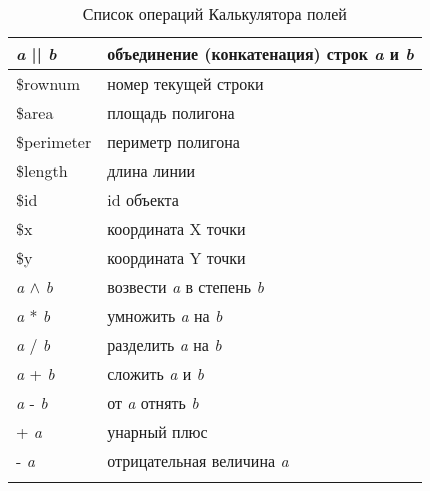 \begin{center}
{\begin{longtable}{|p{4cm}|p{10cm}|}
\hline \textit{a} || \textit{b} & объединение (конкатенация) строк \textit{a} и \textit{b} \\
\hline \$rownum & номер текущей строки \\
\hline \$area & площадь полигона \\
\hline \$perimeter & периметр полигона \\
\hline \$length & длина линии \\
\hline \$id & id объекта \\
\hline \$x & координата X точки \\
\hline \$y & координата Y точки \\
\hline \textit{a} $\wedge$ \textit{b} & возвести \textit{a} в степень \textit{b} \\
\hline \textit{a} * \textit{b} & умножить \textit{a} на \textit{b} \\
\hline \textit{a} / \textit{b} & разделить \textit{a} на \textit{b} \\
\hline \textit{a} + \textit{b} & сложить \textit{a} и \textit{b} \\
\hline \textit{a} - \textit{b} & от \textit{a} отнять \textit{b} \\
\hline + \textit{a} & унарный плюс \\
\hline - \textit{a} & отрицательная величина \textit{a} \\
\hline
\caption{Список операций Калькулятора полей}\\
\end{longtable}}
\end{center}
